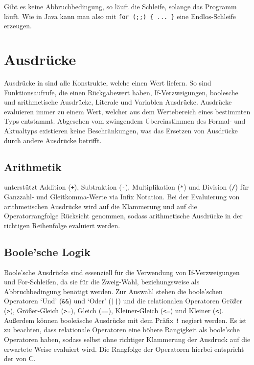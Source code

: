 Gibt es keine Abbruchbedingung, so läuft die Schleife, solange das Programm läuft. Wie in Java kann man also mit \texttt{for (;;) \{ ... \}} eine Endlos-Schleife erzeugen.

\section{Ausdrücke}

Ausdrücke in \toya sind alle Konstrukte, welche einen Wert liefern. So sind Funktionsaufrufe, die einen Rückgabewert haben, If-Verzweigungen, boolesche und arithmetische Ausdrücke, Literale und Variablen Ausdrücke. Ausdrücke evaluieren immer zu einem Wert, welcher aus dem Wertebereich eines bestimmten Typs entstammt. Abgesehen vom zwingendem Übereinstimmen des Formal- und Aktualtyps existieren keine Beschränkungen, was das Ersetzen von Ausdrücke durch andere Ausdrücke betrifft.

\subsection{Arithmetik}

\toya unterstützt Addition (\texttt{+}), Subtraktion (\texttt{-}), Multiplikation (\texttt{*}) und Division (\texttt{/}) für Ganzzahl- und Gleitkomma-Werte via Infix Notation. Bei der Evaluierung von arithmetischen Ausdrücke wird auf die Klammerung und auf die Operatorrangfolge Rücksicht genommen, sodass arithmetische Ausdrücke in der richtigen Reihenfolge evaluiert werden. 


\subsection{Boole'sche Logik}

Boole'sche Ausdrücke sind essenziell für die Verwendung von If-Verzweigungen und For-Schleifen, da sie für die Zweig-Wahl, beziehungsweise als Abbruchbedingung benötigt werden. Zur Auswahl stehen die boole'schen Operatoren `Und' (\texttt{\&\&}) und `Oder' (\texttt{||}) und die relationalen Operatoren Größer (\texttt{>}), Größer-Gleich (\texttt{>=}), Gleich (\texttt{==}), Kleiner-Gleich (\texttt{<=}) und Kleiner (\texttt{<}). Außerdem können booleäsche Ausdrücke mit dem Präfix \texttt{!} negiert werden. Es ist zu beachten, dass relationale Operatoren eine höhere Rangigkeit als boole'sche Operatoren haben, sodass selbst ohne richtiger Klammerung der Ausdruck auf die erwartete Weise evaluiert wird. Die Rangfolge der Operatoren hierbei entspricht der von C.

